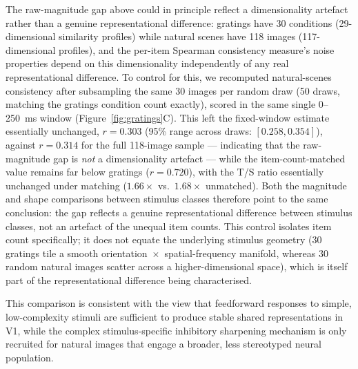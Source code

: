 \documentclass[11pt,onecolumn]{article}
\begin{document}
The raw-magnitude gap above could in principle reflect a dimensionality
artefact rather than a genuine representational difference: gratings have
30 conditions (29-dimensional similarity profiles) while natural scenes
have 118 images (117-dimensional profiles), and the per-item Spearman
consistency measure's noise properties depend on this dimensionality
independently of any real representational difference.  To control for
this, we recomputed natural-scenes consistency after subsampling the same
30 images per random draw (50 draws, matching the gratings condition
count exactly), scored in the same single 0--250~ms window
(Figure~\ref{fig:gratings}C).  This left the fixed-window estimate
essentially unchanged, $r = 0.303$ (95\% range across draws:
$[0.258, 0.354]$), against $r = 0.314$ for the full 118-image sample ---
indicating that the raw-magnitude gap is \emph{not} a dimensionality
artefact --- while the item-count-matched value remains far below gratings
($r = 0.720$), with the T/S ratio essentially unchanged under matching
($1.66\times$ vs.\ $1.68\times$ unmatched).  Both the magnitude and shape
comparisons between stimulus classes therefore point to the same
conclusion: the gap reflects a genuine representational difference
between stimulus classes, not an artefact of the unequal item counts.
This control isolates item count specifically; it does not equate the
underlying stimulus geometry (30 gratings tile a smooth
orientation~$\times$~spatial-frequency manifold, whereas 30 random natural
images scatter across a higher-dimensional space), which is itself part of
the representational difference being characterised.

This comparison is consistent with the view that feedforward responses
to simple, low-complexity stimuli are sufficient to produce stable shared
representations in V1, while the complex stimulus-specific inhibitory
sharpening mechanism is only recruited for natural images that engage a
broader, less stereotyped neural population.
\end{document}
